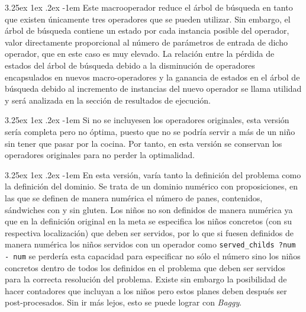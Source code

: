 \documentclass{article}
\makeatletter
\newcommand{\cool}[1] {
        {\texttt{#1}}
    }
\newcounter{subsubsubsection}
\renewcommand\paragraph{\@startsection{paragraph}{5}{\z@}%
      {3.25ex \@plus1ex \@minus.2ex}%
      {-1em}%
      {\normalfont\normalsize\bfseries}}
\makeatother
\begin{document}
    \paragraph{}
    Este macrooperador reduce el árbol de búsqueda en tanto que existen únicamente tres operadores que se pueden utilizar. Sin embargo, el árbol de búsqueda contiene un estado por cada instancia posible del operador, valor directamente proporcional al número de parámetros de entrada de dicho operador, que en este caso es muy elevado. La relación entre la pérdida de estados del árbol de búsqueda debido a la disminución de operadores encapsulados en nuevos macro-operadores y la ganancia de estados en el árbol de búsqueda debido al incremento de instancias del nuevo operador se llama utilidad y será analizada en la sección de resultados de ejecución.
    
    \paragraph{}
    Si no se incluyesen los operadores originales, esta versión sería completa pero no óptima, puesto que no se podría servir a más de un niño sin tener que pasar por la cocina. Por tanto, en esta versión se conservan los operadores originales para no perder la optimalidad.
    
    
    \paragraph{}
    En esta versión, varía tanto la definición del problema como la definición del dominio. Se trata de un dominio numérico con proposiciones, en las que se definen de manera numérica el número de panes, contenidos, sándwiches con y sin gluten. Los niños no son definidos de manera numérica ya que en la definición original en la meta se especifica los niños concretos (con su respectiva localización) que deben ser servidos, por lo que si fuesen definidos de manera numérica los niños servidos con un operador como \cool{served\_childs ?num - num} se perdería esta capacidad para especificar no sólo el número sino los niños concretos dentro de todos los definidos en el problema que deben ser servidos para la correcta resolución del problema. Existe sin embargo la posibilidad de hacer contadores que incluyan a los niños pero estos planes deben después ser post-procesados. Sin ir más lejos, esto se puede lograr con \textit{Baggy}.
    
\end{document}
